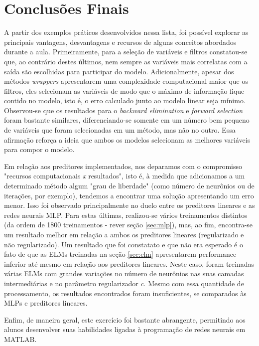 \section{Conclusões Finais} 
 
A partir dos exemplos práticos desenvolvidos nessa lista, foi possível explorar
as principais vantagens, desvantagens e recursos de alguns conceitos abordados
durante a aula. Primeiramente, para a seleção de variáveis e filtros
constatou-se que, ao contrário destes últimos, nem sempre as variáveis mais
correlatas com a saída são escolhidas para participar do modelo.
Adicionalmente, apesar dos métodos \textit{wrappers} apresentarem uma
complexidade computacional maior que os filtros, eles selecionam as variáveis
de modo que o máximo de informação fique contido no modelo, isto é, o erro
calculado junto ao modelo linear seja mínimo. Observou-se que os resultados
para o \textit{backward elimination} e \textit{forward selection} foram 
bastante similares, diferenciando-se somente em um número bem pequeno de
variáveis que foram selecionadas em um método, mas não no outro. Essa afirmação
reforça a ideia que ambos os modelos selecionam as melhores variáveis para
compor o modelo. 

\vspace{12pt}

Em relação aos preditores implementados, nos deparamos com o compromisso
"recursos computacionais \textit{x} resultados", isto é, à medida que
adicionamos a um determinado método algum "grau de liberdade" (como número de
neurônios ou de iterações, por exemplo), tendemos a encontrar uma solução
apresentando um erro menor. Isso foi observado principalmente no duelo entre os
preditores lineares e as redes neurais MLP. Para estas últimas, realizou-se
vários treinamentos distintos (da ordem de 1800 treinamentos - rever seção
\ref{sec:mlp}), mas, ao fim, encontra-se um resultado melhor em relação a ambos
os preditores lineares (regularizado e não regularizado). Um resultado que foi
constatato e que não era esperado é o fato de que as ELMs treinadas na seção
\ref{sec:elm}  apresentarem performance inferior até mesmo em relação aos
preditores lineares. Neste caso, foram treinadas várias ELMs com grandes
variações no número de neurônios nas suas camadas intermediárias e no parâmetro
regularizador \(c\). Mesmo com essa quantidade de processamento, os resultados
encontrados foram insuficientes, se comparados às MLPs e preditores lineares.

\vspace{12pt} 

Enfim, de maneira geral, este exercício foi bastante abrangente, permitindo aos
alunos desenvolver suas habilidades ligadas à programação de redes neurais em
MATLAB.
